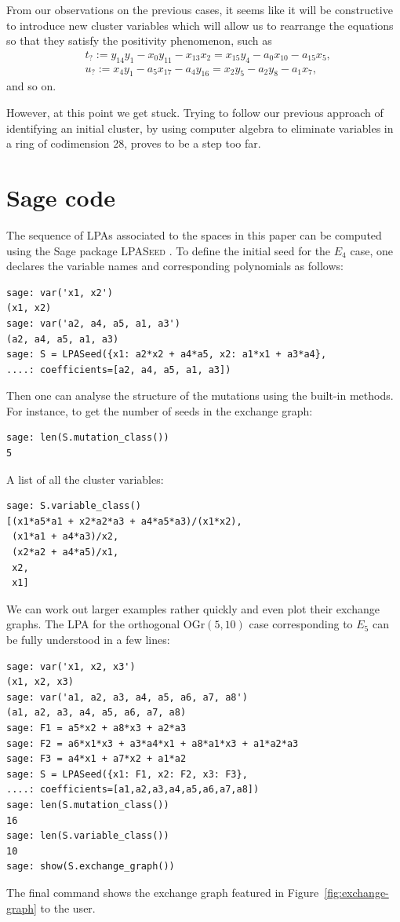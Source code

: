 \documentclass[10pt,a4paper]{amsart}
\numberwithin{equation}{section}
\theoremstyle{definition}
\begin{document}
From our observations on the previous cases, it seems like it will be constructive to introduce new cluster variables which will allow us to rearrange the equations so that they satisfy the positivity phenomenon, such as
\begin{align*}
&t_?:= y_{14}y_1 - x_0y_{11} - x_{13}x_2 = x_{15}y_4 - a_0x_{10} - a_{15}x_5, \\
&u_?:= x_4y_1 - a_5x_{17} -a_4y_{16} = x_2y_5 - a_2y_8 - a_1x_7,
\end{align*}
and so on.

However, at this point we get stuck. Trying to follow our previous approach of identifying an initial cluster, by using computer algebra to eliminate variables in a ring of codimension 28, proves to be a step too far.

\appendix


\section{Sage code} \label{appendixA}
The sequence of LPAs associated to the spaces in this paper can be computed using the Sage package \textsc{LPASeed} \cite{sagecode}. To define the initial seed for the $E_4$ case, one declares the variable names and corresponding polynomials as follows:
\begin{lstlisting}
sage: var('x1, x2')
(x1, x2)
sage: var('a2, a4, a5, a1, a3')
(a2, a4, a5, a1, a3)
sage: S = LPASeed({x1: a2*x2 + a4*a5, x2: a1*x1 + a3*a4},
....: coefficients=[a2, a4, a5, a1, a3])
\end{lstlisting}

Then one can analyse the structure of the mutations using the built-in methods. For instance, to get the number of seeds in the exchange graph:
\begin{lstlisting}
sage: len(S.mutation_class())
5
\end{lstlisting}

A list of all the cluster variables:
\begin{lstlisting}
sage: S.variable_class()
[(x1*a5*a1 + x2*a2*a3 + a4*a5*a3)/(x1*x2),
 (x1*a1 + a4*a3)/x2,
 (x2*a2 + a4*a5)/x1,
 x2,
 x1]
\end{lstlisting}

We can work out larger examples rather quickly and even plot their exchange graphs. The LPA for the orthogonal $\text{OGr}(5, 10)$ case corresponding to $E_5$ can be fully understood in a few lines:
\begin{lstlisting}
sage: var('x1, x2, x3')
(x1, x2, x3)
sage: var('a1, a2, a3, a4, a5, a6, a7, a8')
(a1, a2, a3, a4, a5, a6, a7, a8)
sage: F1 = a5*x2 + a8*x3 + a2*a3
sage: F2 = a6*x1*x3 + a3*a4*x1 + a8*a1*x3 + a1*a2*a3
sage: F3 = a4*x1 + a7*x2 + a1*a2
sage: S = LPASeed({x1: F1, x2: F2, x3: F3},
....: coefficients=[a1,a2,a3,a4,a5,a6,a7,a8])
sage: len(S.mutation_class())
16
sage: len(S.variable_class())
10
sage: show(S.exchange_graph())
\end{lstlisting}
The final command shows the exchange graph featured in Figure~\ref{fig:exchange-graph} to the user.
\end{document}
